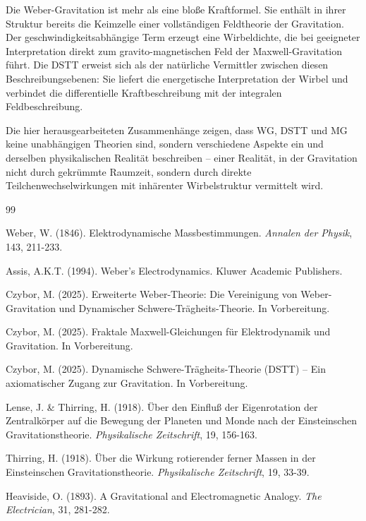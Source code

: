 \documentclass[12pt,a4paper]{article}
\begin{document}
Die Weber-Gravitation ist mehr als eine bloße Kraftformel. Sie enthält in ihrer Struktur bereits die Keimzelle einer vollständigen Feldtheorie der Gravitation. Der geschwindigkeitsabhängige Term erzeugt eine Wirbeldichte, die bei geeigneter Interpretation direkt zum gravito-magnetischen Feld der Maxwell-Gravitation führt. Die DSTT erweist sich als der natürliche Vermittler zwischen diesen Beschreibungsebenen: Sie liefert die energetische Interpretation der Wirbel und verbindet die differentielle Kraftbeschreibung mit der integralen Feldbeschreibung.

Die hier herausgearbeiteten Zusammenhänge zeigen, dass WG, DSTT und MG keine unabhängigen Theorien sind, sondern verschiedene Aspekte ein und derselben physikalischen Realität beschreiben – einer Realität, in der Gravitation nicht durch gekrümmte Raumzeit, sondern durch direkte Teilchenwechselwirkungen mit inhärenter Wirbelstruktur vermittelt wird.

\begin{thebibliography}{99}

Weber, W. (1846). Elektrodynamische Massbestimmungen. \textit{Annalen der Physik}, 143, 211-233.

Assis, A.K.T. (1994). Weber's Electrodynamics. Kluwer Academic Publishers.

Czybor, M. (2025). Erweiterte Weber-Theorie: Die Vereinigung von Weber-Gravitation und Dynamischer Schwere-Trägheits-Theorie. In Vorbereitung.

Czybor, M. (2025). Fraktale Maxwell-Gleichungen für Elektrodynamik und Gravitation. In Vorbereitung.

Czybor, M. (2025). Dynamische Schwere-Trägheits-Theorie (DSTT) – Ein axiomatischer Zugang zur Gravitation. In Vorbereitung.

Lense, J. \& Thirring, H. (1918). Über den Einfluß der Eigenrotation der Zentralkörper auf die Bewegung der Planeten und Monde nach der Einsteinschen Gravitationstheorie. \textit{Physikalische Zeitschrift}, 19, 156-163.

Thirring, H. (1918). Über die Wirkung rotierender ferner Massen in der Einsteinschen Gravitationstheorie. \textit{Physikalische Zeitschrift}, 19, 33-39.

Heaviside, O. (1893). A Gravitational and Electromagnetic Analogy. \textit{The Electrician}, 31, 281-282.

\end{thebibliography}
\end{document}
